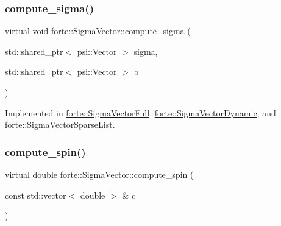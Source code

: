 \mbox{\label{classforte_1_1_sigma_vector_afa184f816a37649a4e2316d62c8b621e}} 
\subsubsection{\texorpdfstring{compute\+\_\+sigma()}{compute\_sigma()}}
{\footnotesize\ttfamily virtual void forte\+::\+Sigma\+Vector\+::compute\+\_\+sigma (\begin{DoxyParamCaption}\item[{std\+::shared\+\_\+ptr$<$ psi\+::\+Vector $>$}]{sigma,  }\item[{std\+::shared\+\_\+ptr$<$ psi\+::\+Vector $>$}]{b }\end{DoxyParamCaption})\hspace{0.3cm}{\ttfamily [pure virtual]}}



Implemented in \mbox{\hyperlink{classforte_1_1_sigma_vector_full_a23130725bbc872ce9e86340c3fff49e5}{forte\+::\+Sigma\+Vector\+Full}}, \mbox{\hyperlink{classforte_1_1_sigma_vector_dynamic_a04a941c88e4c8a1254e96ad8a8dd5c64}{forte\+::\+Sigma\+Vector\+Dynamic}}, and \mbox{\hyperlink{classforte_1_1_sigma_vector_sparse_list_a5f5e4c5457fd9b0511e7c42824dde927}{forte\+::\+Sigma\+Vector\+Sparse\+List}}.

\mbox{\label{classforte_1_1_sigma_vector_afe5ac487b5277b86fbe4398ba861773c}} 
\subsubsection{\texorpdfstring{compute\+\_\+spin()}{compute\_spin()}}
{\footnotesize\ttfamily virtual double forte\+::\+Sigma\+Vector\+::compute\+\_\+spin (\begin{DoxyParamCaption}\item[{const std\+::vector$<$ double $>$ \&}]{c }\end{DoxyParamCaption})\hspace{0.3cm}{\ttfamily [pure virtual]}}



